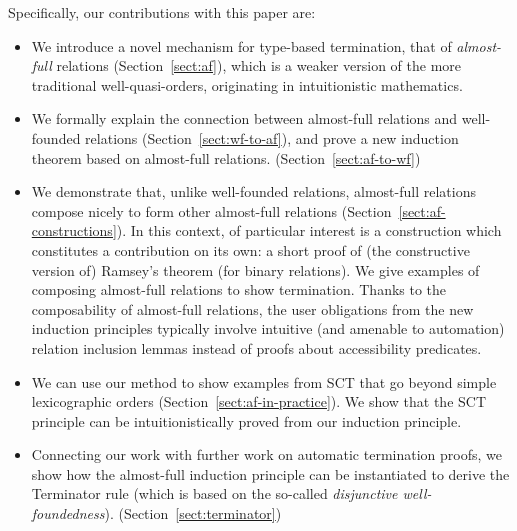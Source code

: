 \documentclass{llncs}
\newcommand{\dv}[1]{{\color{red}{\bf DV:} #1}}
\begin{document}
Specifically, our contributions with this paper are:
\begin{itemize}
  \item We introduce a novel mechanism for type-based termination, 
        that of {\em almost-full} relations (Section~\ref{sect:af}), which is a weaker
        version of the more traditional well-quasi-orders, originating in intuitionistic mathematics.

  \item We formally explain the connection between almost-full relations and 
        well-founded relations (Section~\ref{sect:wf-to-af}), and prove a new induction 
        theorem based on almost-full relations. (Section~\ref{sect:af-to-wf})

  \item We demonstrate that, unlike well-founded relations, almost-full relations 
        compose nicely to form other almost-full relations (Section~\ref{sect:af-constructions}).
        In this context, of particular interest is a construction which constitutes 
        a contribution on its own: a short proof of (the constructive version 
        of) Ramsey's theorem (for binary relations). We give examples of composing almost-full
        relations to show termination. Thanks to the composability of almost-full relations, the
        user obligations from the new induction principles typically involve intuitive (and amenable to automation) 
        relation inclusion lemmas instead of proofs about accessibility predicates. 

  \item We can use our method to show examples from SCT that go beyond 
        simple lexicographic orders (Section~\ref{sect:af-in-practice}). We show that the SCT
        principle can be intuitionistically proved from our induction principle.



  \item Connecting our work with further work on automatic termination proofs, we 
        show how the almost-full induction principle can be instantiated to derive the 
        Terminator rule (which is based on the so-called {\em disjunctive well-foundedness}).
        (Section~\ref{sect:terminator}) 


\end{itemize}
\end{document}
